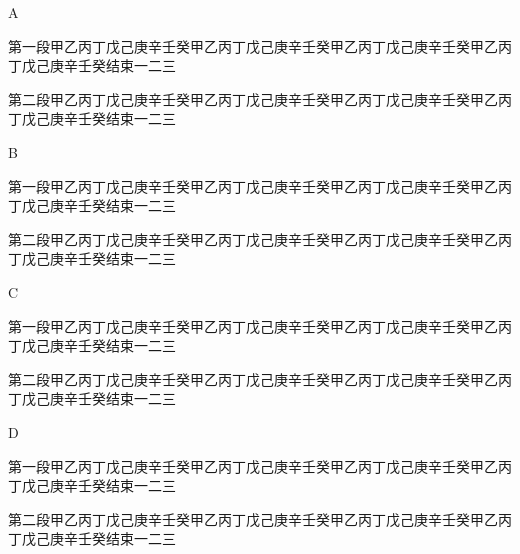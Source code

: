 \documentclass{article}
\newcommand{\A}[1]{\par{\hangindent10mm\hangafter=1\setlength{\parindent}{5mm}\noindent#1\par}}
\newcommand{\B}[1]{\par{\hangindent5mm\hangafter=1\setlength{\parindent}{0mm}\noindent#1\par}}
\newcommand{\C}[1]{\par{\hangindent5mm\hangafter=2\setlength{\parindent}{5mm}\noindent#1\par}}
\newcommand{\D}[1]{\par{\hangindent0mm\hangafter=1\setlength{\parindent}{5mm}\noindent#1\par}}
\begin{document}
A\par\A{第一段甲乙丙丁戊己庚辛壬癸甲乙丙丁戊己庚辛壬癸甲乙丙丁戊己庚辛壬癸甲乙丙丁戊己庚辛壬癸结束一二三

第二段甲乙丙丁戊己庚辛壬癸甲乙丙丁戊己庚辛壬癸甲乙丙丁戊己庚辛壬癸甲乙丙丁戊己庚辛壬癸结束一二三}
B\par\B{第一段甲乙丙丁戊己庚辛壬癸甲乙丙丁戊己庚辛壬癸甲乙丙丁戊己庚辛壬癸甲乙丙丁戊己庚辛壬癸结束一二三

第二段甲乙丙丁戊己庚辛壬癸甲乙丙丁戊己庚辛壬癸甲乙丙丁戊己庚辛壬癸甲乙丙丁戊己庚辛壬癸结束一二三}
C\par\C{第一段甲乙丙丁戊己庚辛壬癸甲乙丙丁戊己庚辛壬癸甲乙丙丁戊己庚辛壬癸甲乙丙丁戊己庚辛壬癸结束一二三

第二段甲乙丙丁戊己庚辛壬癸甲乙丙丁戊己庚辛壬癸甲乙丙丁戊己庚辛壬癸甲乙丙丁戊己庚辛壬癸结束一二三}
D\par\D{第一段甲乙丙丁戊己庚辛壬癸甲乙丙丁戊己庚辛壬癸甲乙丙丁戊己庚辛壬癸甲乙丙丁戊己庚辛壬癸结束一二三

第二段甲乙丙丁戊己庚辛壬癸甲乙丙丁戊己庚辛壬癸甲乙丙丁戊己庚辛壬癸甲乙丙丁戊己庚辛壬癸结束一二三}
\end{document}
